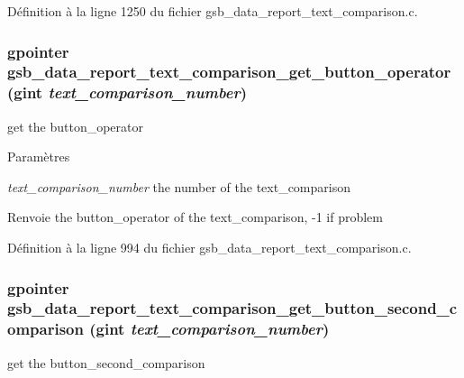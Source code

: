 Définition à la ligne 1250 du fichier gsb\_\-data\_\-report\_\-text\_\-comparison.c.

\subsubsection[{gsb\_\-data\_\-report\_\-text\_\-comparison\_\-get\_\-button\_\-operator}]{\setlength{\rightskip}{0pt plus 5cm}gpointer gsb\_\-data\_\-report\_\-text\_\-comparison\_\-get\_\-button\_\-operator (gint {\em text\_\-comparison\_\-number})}\label{gsb__data__report__text__comparison_8c_af7aa72ef5007f9416ec1137ee5901834}
get the button\_\-operator


\begin{DoxyParams}{Paramètres}
\item[{\em text\_\-comparison\_\-number}]the number of the text\_\-comparison\end{DoxyParams}
\begin{DoxyReturn}{Renvoie}
the button\_\-operator of the text\_\-comparison, -\/1 if problem 
\end{DoxyReturn}


Définition à la ligne 994 du fichier gsb\_\-data\_\-report\_\-text\_\-comparison.c.

\subsubsection[{gsb\_\-data\_\-report\_\-text\_\-comparison\_\-get\_\-button\_\-second\_\-comparison}]{\setlength{\rightskip}{0pt plus 5cm}gpointer gsb\_\-data\_\-report\_\-text\_\-comparison\_\-get\_\-button\_\-second\_\-comparison (gint {\em text\_\-comparison\_\-number})}\label{gsb__data__report__text__comparison_8c_ac59873572d63412f35795f65988f9d9b}
get the button\_\-second\_\-comparison


